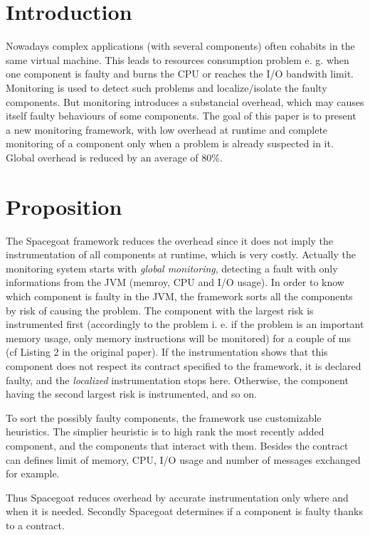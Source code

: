 \section{Introduction}

Nowadays complex applications (with several components) often cohabits in the same virtual machine. This leads to resources consumption problem e. g. when one component is faulty and burns the CPU or reaches the I/O bandwith limit. Monitoring is used to detect such problems and localize/isolate the faulty components. But monitoring introduces a substancial overhead, which may causes itself faulty behaviours of some components. The goal of this paper is to present a new monitoring framework, with low overhead at runtime and complete monitoring of a component only when a problem is already suspected in it. Global overhead is reduced by an average of 80\%.

\section{Proposition}

The \textsf{Spacegoat} framework reduces the overhead since it does not imply the instrumentation of all components at runtime, which is very costly. Actually the monitoring system starts with \emph{global monitoring}, detecting a fault with only informations from the JVM (memroy, CPU and I/O usage). In order to know which component is faulty in the JVM, the framework sorts all the components by risk of causing the problem. The component with the largest risk is instrumented first (accordingly to the problem i. e. if the problem is an important memory usage, only memory instructions will be monitored) for a couple of ms (cf Listing 2 in the original paper). If the instrumentation shows that this component does not respect its contract specified to the framework, it is declared faulty, and the \emph{localized} instrumentation stops here. Otherwise, the component having the second largest risk is instrumented, and so on. 

To sort the possibly faulty components, the framework use customizable heuristics. The simplier heuristic is to high rank the most recently added component, and the components that interact with them. Besides the contract can defines limit of memory, CPU, I/O usage and number of messages exchanged for example.

Thus \textsf{Spacegoat} reduces overhead by accurate instrumentation only where and when it is needed. Secondly \textsf{Spacegoat} determines if a component is faulty thanks to a contract. 

